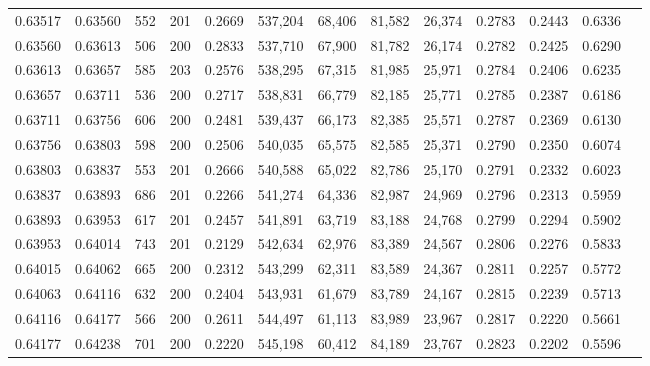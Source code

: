 \begin{tabular}{rrrrrrrrrrrrr}
0.63517 & 0.63560 &   552 & 201 &                                     0.2669 & 537,204 &  68,406 &  81,582 &  26,374 & 0.2783 & 0.2443 & 0.6336 \\
0.63560 & 0.63613 &   506 & 200 &                                     0.2833 & 537,710 &  67,900 &  81,782 &  26,174 & 0.2782 & 0.2425 & 0.6290 \\
0.63613 & 0.63657 &   585 & 203 &                                     0.2576 & 538,295 &  67,315 &  81,985 &  25,971 & 0.2784 & 0.2406 & 0.6235 \\
0.63657 & 0.63711 &   536 & 200 &                                     0.2717 & 538,831 &  66,779 &  82,185 &  25,771 & 0.2785 & 0.2387 & 0.6186 \\
0.63711 & 0.63756 &   606 & 200 &                                     0.2481 & 539,437 &  66,173 &  82,385 &  25,571 & 0.2787 & 0.2369 & 0.6130 \\
0.63756 & 0.63803 &   598 & 200 &                                     0.2506 & 540,035 &  65,575 &  82,585 &  25,371 & 0.2790 & 0.2350 & 0.6074 \\
0.63803 & 0.63837 &   553 & 201 &                                     0.2666 & 540,588 &  65,022 &  82,786 &  25,170 & 0.2791 & 0.2332 & 0.6023 \\
0.63837 & 0.63893 &   686 & 201 &                                     0.2266 & 541,274 &  64,336 &  82,987 &  24,969 & 0.2796 & 0.2313 & 0.5959 \\
0.63893 & 0.63953 &   617 & 201 &                                     0.2457 & 541,891 &  63,719 &  83,188 &  24,768 & 0.2799 & 0.2294 & 0.5902 \\
0.63953 & 0.64014 &   743 & 201 &                                     0.2129 & 542,634 &  62,976 &  83,389 &  24,567 & 0.2806 & 0.2276 & 0.5833 \\
0.64015 & 0.64062 &   665 & 200 &                                     0.2312 & 543,299 &  62,311 &  83,589 &  24,367 & 0.2811 & 0.2257 & 0.5772 \\
0.64063 & 0.64116 &   632 & 200 &                                     0.2404 & 543,931 &  61,679 &  83,789 &  24,167 & 0.2815 & 0.2239 & 0.5713 \\
0.64116 & 0.64177 &   566 & 200 &                                     0.2611 & 544,497 &  61,113 &  83,989 &  23,967 & 0.2817 & 0.2220 & 0.5661 \\
0.64177 & 0.64238 &   701 & 200 &                                     0.2220 & 545,198 &  60,412 &  84,189 &  23,767 & 0.2823 & 0.2202 & 0.5596 \\

\end{tabular}
